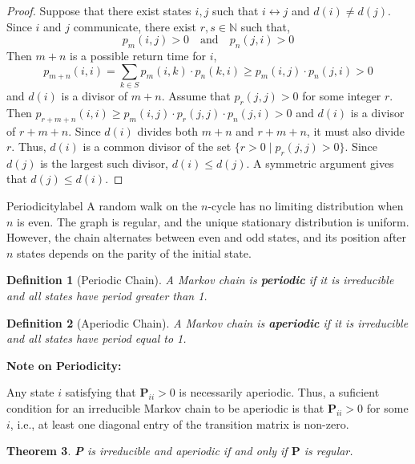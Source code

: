 \documentclass{tufte-handout}
\newtheorem{thm}{Theorem}
\newtheorem{defn}[thm]{Definition}
\begin{document}
  \begin{proof}
    Suppose that there exist states $i, j$ such that $i \leftrightarrow j$ and $d(i) \neq d(j)$. Since $i$ and $j$ communicate, there exist $r, s \in \mathbb{N}$ such that,
    \[p_m(i,j) > 0 \quad \text{and} \quad p_n(j,i) > 0\]
    \noindent Then $m + n$ is a possible return time for $i$,
    \[p_{m + n}(i,i) = \sum_{k \in S} p_m(i,k) \cdot p_n(k,i) \geq p_m(i,j) \cdot p_n(j,i) > 0\]
    \noindent and $d(i)$ is a divisor of $m + n$. Assume that $p_r(j,j) > 0$ for some integer $r$. Then $p_{r + m + n}(i,i) \geq p_m(i,j) \cdot p_r(j,j) \cdot p_n(j,i) > 0$ and $d(i)$ is a divisor of $r + m + n$. Since $d(i)$ divides both $m + n$ and $r + m + n$, it must also divide $r$. Thus, $d(i)$ is a common divisor of the set $\{r > 0 \mid p_r(j,j) > 0\}$. Since $d(j)$ is the largest such divisor, $d(i) \leq d(j)$. A symmetric argument gives that $d(j) \leq d(i)$.
  \end{proof}

  \begin{ex}{Periodicity}{label}
    A random walk on the $n$-cycle has no limiting distribution when $n$ is even. The graph is regular, and the unique stationary distribution is uniform. However, the chain alternates between even and odd states, and its position after $n$ states depends on the parity of the initial state. 
  \end{ex}

  \begin{defn}[Periodic Chain]
    A Markov chain is \textbf{periodic} if it is irreducible and all states have period greater than 1.
  \end{defn}

  \begin{defn}[Aperiodic Chain]
    A Markov chain is \textbf{aperiodic} if it is irreducible and all states have period equal to 1.
  \end{defn}

  \begin{marginfigure}
    \textbf{Note on Periodicity:}

    \noindent Any state $i$ satisfying that $\boldsymbol{P}_{ii} > 0$ is necessarily aperiodic. Thus, a suficient condition for an irreducible Markov chain to be aperiodic is that $\boldsymbol{P}_{ii} > 0$ for some $i$, i.e., at least one diagonal entry of the transition matrix is non-zero.
  \end{marginfigure}

    \begin{thm}
    \textbf{P} is irreducible and aperiodic if and only if $\boldsymbol{P}$ is regular.
  \end{thm}
\end{document}
